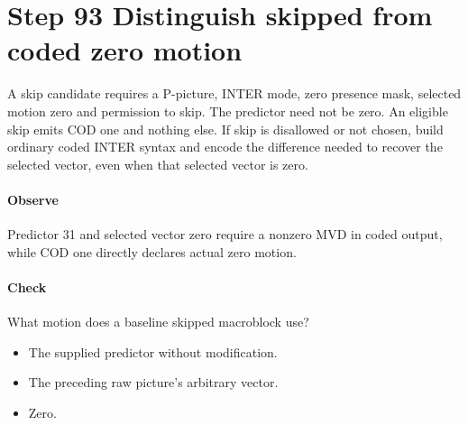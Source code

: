 \section{Step 93 Distinguish skipped from coded zero motion}\label{h263-syntax-s03}
A skip candidate requires a P-picture, INTER mode, zero presence mask, selected
motion zero and permission to skip. The predictor need not be zero. An eligible
skip emits COD one and nothing else. If skip is disallowed or not chosen, build
ordinary coded INTER syntax and encode the difference needed to recover the
selected vector, even when that selected vector is zero.

\paragraph{Observe} Predictor 31 and selected vector zero require a nonzero MVD
in coded output, while COD one directly declares actual zero motion.
\paragraph{Check} What motion does a baseline skipped macroblock use?
\begin{itemize}
  \item[A.] The supplied predictor without modification.
  \item[B.] The preceding raw picture's arbitrary vector.
  \item[C.] Zero.
\end{itemize}
